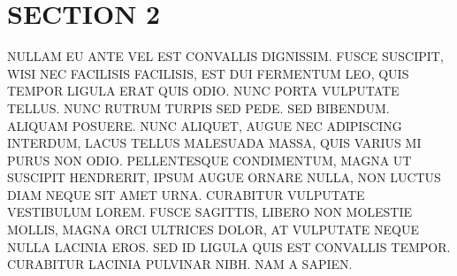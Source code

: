 
\section{SECTION 2}

NULLAM EU ANTE VEL EST CONVALLIS DIGNISSIM.  FUSCE SUSCIPIT, WISI NEC FACILISIS FACILISIS, EST DUI FERMENTUM LEO, QUIS TEMPOR LIGULA ERAT QUIS ODIO.  NUNC PORTA VULPUTATE TELLUS.  NUNC RUTRUM TURPIS SED PEDE.  SED BIBENDUM.  ALIQUAM POSUERE.  NUNC ALIQUET, AUGUE NEC ADIPISCING INTERDUM, LACUS TELLUS MALESUADA MASSA, QUIS VARIUS MI PURUS NON ODIO.  PELLENTESQUE CONDIMENTUM, MAGNA UT SUSCIPIT HENDRERIT, IPSUM AUGUE ORNARE NULLA, NON LUCTUS DIAM NEQUE SIT AMET URNA.  CURABITUR VULPUTATE VESTIBULUM LOREM.  FUSCE SAGITTIS, LIBERO NON MOLESTIE MOLLIS, MAGNA ORCI ULTRICES DOLOR, AT VULPUTATE NEQUE NULLA LACINIA EROS.  SED ID LIGULA QUIS EST CONVALLIS TEMPOR.  CURABITUR LACINIA PULVINAR NIBH.  NAM A SAPIEN.
